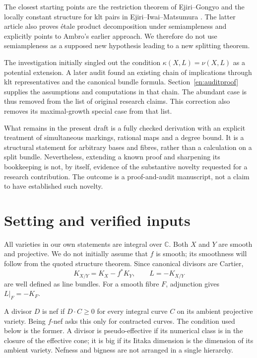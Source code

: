 \documentclass[12pt]{amsart}
\theoremstyle{definition}
\theoremstyle{remark}
\numberwithin{equation}{section}
\newcommand{\C}{\mathbb{C}}
\begin{document}
The closest starting points are the restriction theorem of Ejiri--Gongyo \cite{en:EG} and the locally constant structure for klt pairs in Ejiri--Iwai--Matsumura \cite{en:EIM}. The latter article also proves \'etale product decomposition under semiampleness and explicitly points to Ambro's earlier approach. We therefore do not use semiampleness as a supposed new hypothesis leading to a new splitting theorem.

The investigation initially singled out the condition $\kappa(X,L)=\nu(X,L)$ as a potential extension. A later audit found an existing chain of implications through klt representatives and the canonical bundle formula. Section~\ref{en:auditproof} supplies the assumptions and computations in that chain. The abundant case is thus removed from the list of original research claims. This correction also removes its maximal-growth special case from that list.

What remains in the present draft is a fully checked derivation with an explicit treatment of simultaneous markings, rational maps and a degree bound. It is a structural statement for arbitrary bases and fibres, rather than a calculation on a split bundle. Nevertheless, extending a known proof and sharpening its bookkeeping is not, by itself, evidence of the substantive novelty requested for a research contribution. The outcome is a proof-and-audit manuscript, not a claim to have established such novelty.

\section{Setting and verified inputs}\label{en:setting}
All varieties in our own statements are integral over $\C$. Both $X$ and $Y$ are smooth and projective. We do not initially assume that $f$ is smooth; its smoothness will follow from the quoted structure theorem. Since canonical divisors are Cartier,
\[
 K_{X/Y}=K_X-f^*K_Y,\qquad L=-K_{X/Y}
\]
are well defined as line bundles. For a smooth fibre $F$, adjunction gives $L|_F=-K_F$.

A divisor $D$ is nef if $D\cdot C\geq0$ for every integral curve $C$ on its ambient projective variety. Being $f$-nef asks this only for contracted curves. The condition used below is the former. A divisor is pseudo-effective if its numerical class is in the closure of the effective cone; it is big if its Iitaka dimension is the dimension of its ambient variety. Nefness and bigness are not arranged in a single hierarchy.
\end{document}
